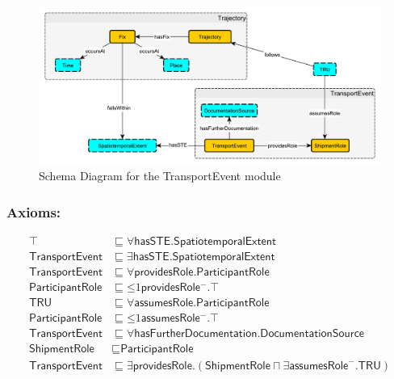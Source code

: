 \begin{figure}[tb]
\begin{center}
\includegraphics[width=.9\textwidth]{diagrams/transport-event}
\end{center}
\caption{Schema Diagram for the TransportEvent module}
\label{fig:TransportEvent}
\end{figure}

\subsubsection*{Axioms:}
\begin{align}
    \top &\sqsubseteq \forall\textsf{hasSTE.SpatiotemporalExtent}\\
    \textsf{TransportEvent} &\sqsubseteq \exists\textsf{hasSTE.SpatiotemporalExtent}\\
    \textsf{TransportEvent} &\sqsubseteq \forall\textsf{providesRole.ParticipantRole}\\
    \textsf{ParticipantRole} &\sqsubseteq \mathord{\leq} 1 \textsf{providesRole}\mathord{^-}.\top\\
    \textsf{TRU} &\sqsubseteq \forall\textsf{assumesRole.ParticipantRole}\\
    \textsf{ParticipantRole} &\sqsubseteq \mathord{\leq} 1 \textsf{assumesRole}\mathord{^-}.\top\\
    \textsf{TransportEvent} &\sqsubseteq \forall\textsf{hasFurtherDocumentation.DocumentationSource} \\
    \textsf{ShipmentRole} &\sqsubseteq \textsf{ParticipantRole}\\
    \textsf{TransportEvent} &\sqsubseteq \exists\textsf{providesRole}.(\textsf{ShipmentRole} \sqcap \exists \textsf{assumesRole}^-.\textsf{TRU})
\end{align}

